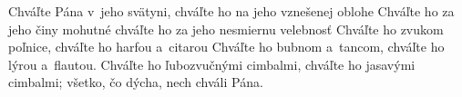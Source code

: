 Chváľte Pána v~jeho svätyni,
chváľte ho na jeho vznešenej oblohe
\versseparator
Chváľte ho za jeho činy mohutné
chváľte ho za jeho nesmiernu velebnosť
\versseparator
Chváľte ho zvukom poľnice,
chváľte ho harfou a~citarou
\versseparator
Chváľte ho bubnom a~tancom,
chváľte ho lýrou a~flautou.
\versseparator
Chváľte ho ľubozvučnými cimbalmi,
chváľte ho jasavými cimbalmi;
všetko, čo dýcha, nech chváli Pána.
